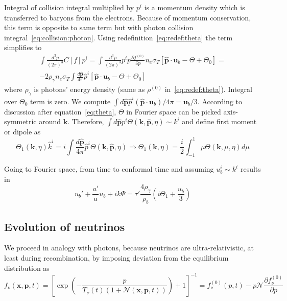 \documentclass[12pt]{extarticle}
\numberwithin{problem}{section}
\numberwithin{theorem}{section}
\begin{document}
	Integral of collision integral multiplied by $p^i$ is a momentum density which is transferred to baryons from the electrons. Because of momentum conservation, this term is opposite to same term but with photon collision integral~\ref{eq:collision:photon}. Using redefinition~\ref{eq:redef:theta} the term simplifies to
	\begin{multline}
		\int \frac{d^3p}{(2\pi)^3} C[f]p^i = \int\frac{d^3p}{(2\pi)^3} p^ip\frac{\partial f^{(0)}}{\partial p}n_e\sigma_T\left[\mathbf{\hat{p}}\cdot\mathbf{u}_b - \Theta + \Theta_0\right] =\\
		-2\rho_\gamma n_e\sigma_T\int\frac{d\mathbf{\hat{p}}}{4\pi}\hat{p}^i[\mathbf{\hat{p}}\cdot\mathbf{u}_b - \Theta + \Theta_0]
	\end{multline}
	where $\rho_\gamma$ is photons' energy density (same as $\rho^{(0)}$ in~\ref{eq:redef:theta}). Integral over $\Theta_0$ term is zero. We compute $\int d\mathbf{\hat{p}} \hat{p}^i(\mathbf{\hat{p}}\cdot\mathbf{u}_b)/4\pi = \mathbf{u}_b / 3$. According to discussion after equation~\ref{eq:theta}, $\Theta$ in Fourier space can be picked axis-symmetric around $\mathbf{k}$. Therefore, $\int d\mathbf{\hat{p}} p^i \Theta(\mathbf{k}, \mathbf{\hat{p}}, \eta)\sim k^i$ and define first moment or dipole as
	\begin{equation}
		\Theta_1(\mathbf{k}, \eta)\hat{k}^i = i\int \frac{d\mathbf{\hat{p}}}{4\pi} \hat{p}^i\Theta(\mathbf{k}, \mathbf{\hat{p}}, \eta)\Rightarrow\Theta_1(\mathbf{k}, \eta) = \frac{i}{2}\int^{1}_{-1}\mu\Theta(\mathbf{k},\mu,\eta) d\mu
	\end{equation}
	
	Going to Fourier space, from time to conformal time and assuming $u^i_b\sim k^i$ results in 
	\begin{equation}
		\label{eq:baryons}
		u_b' + \frac{a'}{a}u_b + ik\Psi = \tau'\frac{4\rho_\gamma}{\rho_b}\left(i\Theta_1 + \frac{u_b}{3}\right)		
	\end{equation}

	\subsection{Evolution of neutrinos}
	We proceed in analogy with photons, because neutrinos are ultra-relativistic, at least during recombination, by imposing deviation from the equilibrium distribution as
	\begin{equation}
		f_\nu(\mathbf{x}, \mathbf{p}, t) = \left[\exp\left(-\frac{p}{T_\nu(t)(1 + \mathcal{N}(\mathbf{x}, \mathbf{p}, t))}\right) + 1\right]^{-1} = f_\nu^{(0)}(p, t) - p\mathcal{N}\frac{\partial f_\nu^{(0)}}{\partial p}
	\end{equation}
\end{document}
